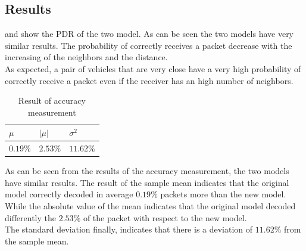 \subsection{Results}
\label{sec:Resultaccuracy}
 and  show the PDR of the two model. As can be seen the two models have very similar results. The probability of correctly receives a packet decrease with the increasing of the neighbors and the distance.\\
As expected, a pair of vehicles that are very close have a very high probability of correctly receive a packet even if the receiver has an high number of neighbors.\\
\begin{table}[H]
    \centering
    {\tabulinesep=2.2mm
    \begin{tabu}{|l |l |l|}
        \hline
        $\mu$ & $|\mu|$ & $\sigma^2$  \\
        \hline
        $0.19\%$ & $2.53\%$ & $11.62\%$ \\
        \hline
    \end{tabu}}
    \caption{Result of accuracy measurement}
    \label{tab:accuracy}
\end{table}
As can be seen from  the results of the accuracy measurement, the two models have similar results. The result of the sample mean indicates that the original model correctly decoded in average $0.19\%$ packets more than the new model.\\
While the absolute value of the mean indicates that the original model decoded differently the $2.53\%$ of the packet with respect to the new model.\\
The standard deviation finally, indicates that there is a deviation of $11.62\%$ from the sample mean.
\newpage
